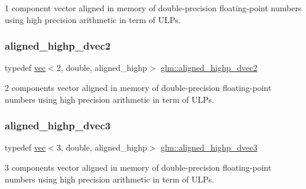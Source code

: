 1 component vector aligned in memory of double-\/precision floating-\/point numbers using high precision arithmetic in term of U\+L\+Ps. 

\mbox{\label{group__gtc__type__aligned_gadc0edec95aa740d8ec351ef1e2dd39de}} 
\subsubsection{\texorpdfstring{aligned\+\_\+highp\+\_\+dvec2}{aligned\_highp\_dvec2}}
{\footnotesize\ttfamily typedef \hyperlink{structglm_1_1vec}{vec}$<$2, double, aligned\+\_\+highp$>$ \hyperlink{group__gtc__type__aligned_gadc0edec95aa740d8ec351ef1e2dd39de}{glm\+::aligned\+\_\+highp\+\_\+dvec2}}



2 components vector aligned in memory of double-\/precision floating-\/point numbers using high precision arithmetic in term of U\+L\+Ps. 

\mbox{\label{group__gtc__type__aligned_gafb21f8db25007665c2cb2a9b250471aa}} 
\subsubsection{\texorpdfstring{aligned\+\_\+highp\+\_\+dvec3}{aligned\_highp\_dvec3}}
{\footnotesize\ttfamily typedef \hyperlink{structglm_1_1vec}{vec}$<$3, double, aligned\+\_\+highp$>$ \hyperlink{group__gtc__type__aligned_gafb21f8db25007665c2cb2a9b250471aa}{glm\+::aligned\+\_\+highp\+\_\+dvec3}}



3 components vector aligned in memory of double-\/precision floating-\/point numbers using high precision arithmetic in term of U\+L\+Ps. 

\mbox{\label{group__gtc__type__aligned_ga4b7b03b9178c6f0574c26181a054beec}} 
